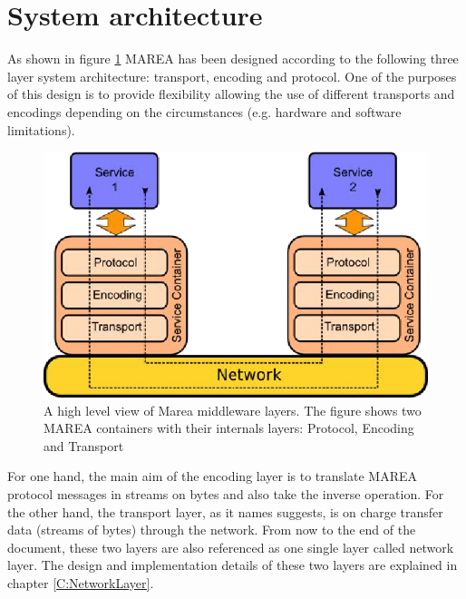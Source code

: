 \section{System architecture}\label{S:MAREA-architecture}

As shown in figure \ref{fig:marea-system-architecture} MAREA has been designed according to the following three layer system architecture: transport, encoding and protocol. One of the purposes of this design is to provide flexibility allowing the use of different transports and encodings depending on the circumstances (e.g. hardware and software limitations).

\begin{figure}[H]\begin{center}
 \centering
  \captionsetup{justification=centering}
  \includegraphics[scale=1]{pictures/marea/Architecture}
  \caption{A high level view of Marea middleware layers. The figure shows two MAREA containers with their internals layers: Protocol, Encoding and Transport  \cite{cite:thesis-soa-avionics} \label{fig:marea-system-architecture}}
\end{center}\end{figure} 

For one hand, the main aim of the encoding layer is to translate MAREA protocol messages in streams on bytes and also take the inverse operation. For the other hand, the transport layer, as it names suggests, is on charge transfer data (streams of bytes) through the network. From now to the end of the document, these two layers are also referenced as one single layer called network layer. The design and implementation details of these two layers are explained in chapter \ref{C:NetworkLayer}.

